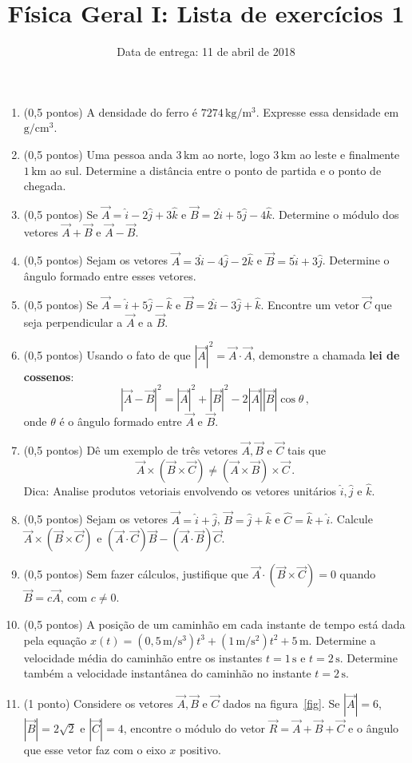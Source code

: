 \documentclass[12pt,a4paper]{article}
\title{Física Geral I: Lista de exercícios 1}
\author{Data de entrega: 11 de abril de 2018}
\date{}
\newcommand{\un}[1]{\mathrm{#1}}
\begin{document}
\maketitle
\begin{enumerate}
	\item (0,5 pontos) A densidade do ferro é $7274\,\un{kg}/\un{m}^3$. Expresse essa densidade em $\un{g}/\un{cm}^3$.
	\item (0,5 pontos) Uma pessoa anda $3\,\un{km}$ ao norte, logo $3\,\un{km}$ ao leste e finalmente $1\,\un{km}$ ao sul. Determine a distância entre o ponto de partida e o ponto de chegada.
	\item (0,5 pontos) Se $\vec A=\hat i-2\hat j+3\hat k$ e $\vec B=2\hat i+5\hat j-4\hat k$. Determine o módulo dos vetores $\vec A+\vec B$ e $\vec A-\vec B$.
	\item (0,5 pontos) Sejam os vetores $\vec A=3\hat i-4\hat j-2\hat k$ e $\vec B=5\hat i+3\hat j$. Determine o ângulo formado entre esses vetores. 
	\item (0,5 pontos) Se $\vec A=\hat i+5\hat j-\hat k$ e $\vec B=2\hat i-3\hat j+\hat k$. Encontre um vetor $\vec C$ que seja perpendicular a $\vec A$ e a $\vec B$. 
	\item (0,5 pontos) Usando o fato de que $|\vec A|^2=\vec A\cdot\vec A$, demonstre a chamada \textbf{lei de cossenos}:
	$$|\vec A-\vec B|^2=|\vec A|^2+|\vec B|^2-2|\vec A||\vec B|\cos\theta\,,$$
	onde $\theta$ é o ângulo formado entre $\vec A$ e $\vec B$.
	\item (0,5 pontos) Dê um exemplo de três vetores $\vec A, \vec B$ e $\vec C$ tais que
	$$\vec A\times (\vec B\times \vec C)\ne (\vec A\times \vec B)\times\vec C\,.$$
	Dica: Analise produtos vetoriais envolvendo os vetores unitários $\hat i,\hat j$ e $\hat k$.
	\item (0,5 pontos) Sejam os vetores $\vec A=\hat i+\hat j$, $\vec B=\hat j+\hat k$ e $\hat C=\hat k+\hat i$. Calcule $\vec A\times (\vec B\times\vec C)$ e $(\vec A\cdot\vec C)\vec B-(\vec A\cdot\vec B)\vec C$.
	\item (0,5 pontos) Sem fazer cálculos, justifique que $\vec A\cdot (\vec B\times\vec C)=0$ quando $\vec B=c\vec A$, com $c\ne 0$.
	\item (0,5 pontos) A posição de um caminhão em cada instante de tempo está dada pela equação $x(t)=(0,5 \,\un{m}/\un{s}^3)t^3+(1\,\un{m}/\un{s}^2)t^2+5\,\un{m}$. Determine a velocidade média do caminhão entre os instantes $t=1\,\un s$ e $t=2\,\un s$. Determine também a velocidade instantânea do caminhão no instante $t=2\,\un s$.
	\item (1 ponto) Considere os vetores $\vec A, \vec B$ e $\vec C$ dados na figura~\ref{fig}. Se $|\vec A|=6$, $|\vec B|=2\sqrt{2}$ e $|\vec C|=4$, encontre o módulo do vetor $\vec R=\vec A+\vec B+\vec C$ e o ângulo que esse vetor faz com o eixo $x$ positivo.

\end{enumerate}
\end{document}

